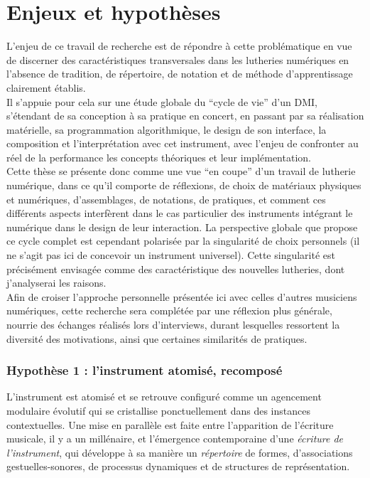 \section{Enjeux et hypothèses}

\noindent L'enjeu de ce travail de recherche est de répondre à cette problématique en vue de discerner des caractéristiques transversales dans les lutheries numériques en l'absence de tradition, de répertoire, de notation et de méthode d'apprentissage clairement établis.\\
\indent Il s'appuie pour cela sur une étude globale du ``cycle de vie'' d'un \gls{DMI}, s'étendant de sa conception à sa pratique en concert, en passant par sa réalisation matérielle, sa programmation algorithmique, le design de son interface, la composition et l'interprétation avec cet instrument, avec l'enjeu de confronter au réel de la performance les concepts théoriques et leur implémentation.\\
\indent Cette thèse se présente donc comme une vue ``en coupe'' d'un travail de lutherie numérique, dans ce qu'il comporte de réflexions, de choix de matériaux physiques et numériques, d'assemblages, de notations, de pratiques, et comment ces différents aspects interfèrent dans le cas particulier des instruments intégrant le numérique dans le design de leur interaction. La perspective globale que propose ce cycle complet est cependant polarisée par la singularité de choix personnels (il ne s'agit pas ici de concevoir un instrument universel). Cette singularité est précisément envisagée comme des caractéristique des nouvelles lutheries, dont j'analyserai les raisons.\\
\indent Afin de croiser l'approche personnelle présentée ici avec celles d'autres musiciens numériques, cette recherche sera complétée par une réflexion plus générale, nourrie des échanges réalisés lors d'interviews, durant lesquelles ressortent la diversité des motivations, ainsi que certaines similarités de pratiques.

\subsubsection*{Hypothèse 1 : l'instrument atomisé, recomposé}

\noindent L'instrument est atomisé et se retrouve configuré comme un agencement modulaire évolutif qui se cristallise ponctuellement dans des instances contextuelles. Une mise en parallèle est faite entre l'apparition de l'écriture musicale, il y a un millénaire, et l'émergence contemporaine d'une \textit{écriture de l'instrument}, qui développe à sa manière un \textit{répertoire} de formes, d'associations gestuelles-sonores, de processus dynamiques et de structures de représentation.

